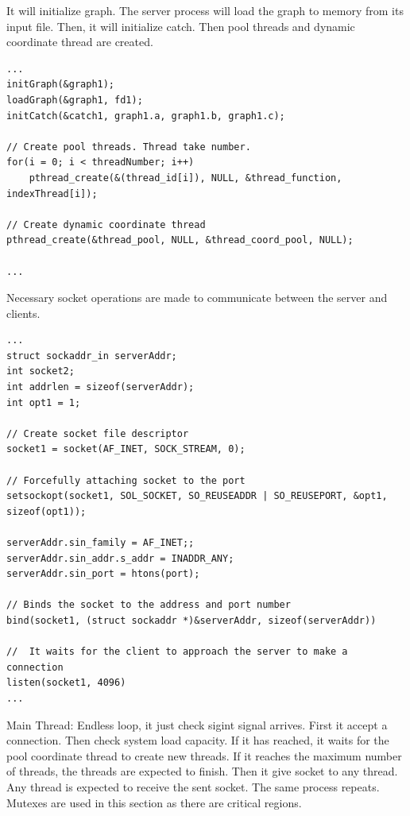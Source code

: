 \documentclass{article}
\begin{document}
\noindent It will initialize graph. The server process will load the graph to memory from its input file. Then, it will initialize catch. Then pool threads and dynamic coordinate thread are created.
\begin{lstlisting}[style=CStyle]
...
initGraph(&graph1);
loadGraph(&graph1, fd1);
initCatch(&catch1, graph1.a, graph1.b, graph1.c);

// Create pool threads. Thread take number.
for(i = 0; i < threadNumber; i++)
    pthread_create(&(thread_id[i]), NULL, &thread_function, indexThread[i]);
    
// Create dynamic coordinate thread
pthread_create(&thread_pool, NULL, &thread_coord_pool, NULL);

...
\end{lstlisting}

\noindent Necessary socket operations are made to communicate between the server and clients.
\begin{lstlisting}[style=CStyle]
...
struct sockaddr_in serverAddr;
int socket2;
int addrlen = sizeof(serverAddr);
int opt1 = 1;

// Create socket file descriptor 
socket1 = socket(AF_INET, SOCK_STREAM, 0);

// Forcefully attaching socket to the port
setsockopt(socket1, SOL_SOCKET, SO_REUSEADDR | SO_REUSEPORT, &opt1, sizeof(opt1));

serverAddr.sin_family = AF_INET;; 
serverAddr.sin_addr.s_addr = INADDR_ANY; 
serverAddr.sin_port = htons(port);

// Binds the socket to the address and port number
bind(socket1, (struct sockaddr *)&serverAddr, sizeof(serverAddr))

//  It waits for the client to approach the server to make a connection
listen(socket1, 4096)
...
\end{lstlisting}
\noindent Main Thread: Endless loop, it just check sigint signal arrives. First it accept a connection. Then check system load capacity. If it has reached, it waits for the pool coordinate thread to create new threads. If it reaches the maximum number of threads, the threads are expected to finish. Then it give socket to any thread. Any thread is expected to receive the sent socket. The same process repeats. Mutexes are used in this section as there are critical regions.
\end{document}
